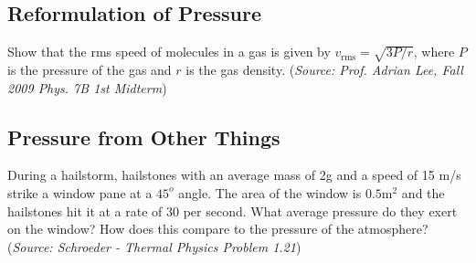 \documentclass{article}
\begin{document}
\subsection{Reformulation of Pressure}

Show that the rms speed of molecules in a gas is given by $v_{\mathrm{rms}} = \sqrt{3P/r}$, where $P$ is the pressure of the gas and $r$ is the gas density. (\textit{Source: Prof. Adrian Lee, Fall 2009 Phys. 7B 1st Midterm})

\subsection{Pressure from Other Things}

During a hailstorm, hailstones with an average mass of 2g and a speed of 15 m/s strike a window pane at a $45^{o}$ angle. The area of the window is $0.5 \mathrm{m}^2$ and the hailstones hit it at a rate of 30 per second. What average pressure do they exert on the window? How does this compare to the pressure of the atmosphere? (\textit{Source: Schroeder - Thermal Physics Problem 1.21})
\end{document}
